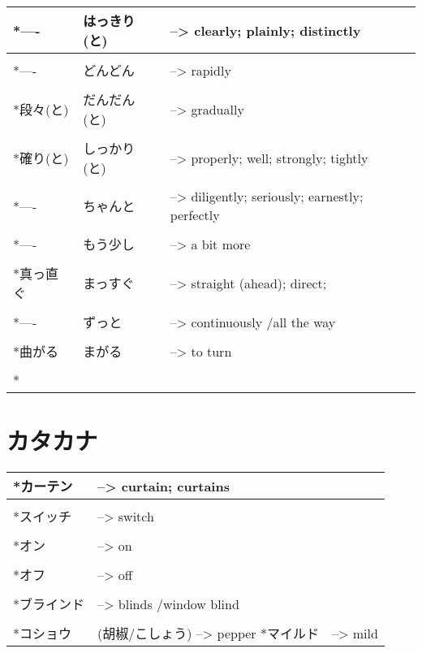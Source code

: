 \documentclass{article}
\begin{document}
\begin{tabular}{ l | l p{13cm} }
*----&はっきり(と)&--> clearly; plainly; distinctly \\ \hline\\[-1em]
*----&どんどん&--> rapidly \\ \hline\\[-1em]
*段々(と)&だんだん(と)&--> gradually \\ \hline\\[-1em]
*確り(と)&しっかり(と)&--> properly; well; strongly; tightly \\ \hline\\[-1em]
*----&ちゃんと&--> diligently; seriously; earnestly; perfectly \\ \hline\\[-1em]
*----&もう少し&--> a bit more \\ \hline\\[-1em]
*真っ直ぐ&まっすぐ&--> straight (ahead); direct; \\ \hline\\[-1em]
*----&ずっと&--> continuously /all the way \\ \hline\\[-1em]
*曲がる&まがる&--> to turn \\ \hline\\[-1em]
*
\end{tabular}





\part*{カタカナ}
\begin{tabular}{ p{3cm} | l l }
*カーテン&--> curtain; curtains \\ \hline\\[-1em]
*スイッチ&--> switch \\ \hline\\[-1em]
*オン&--> on \\ \hline\\[-1em]
*オフ&--> off \\ \hline\\[-1em]
*ブラインド&--> blinds /window blind \\ \hline\\[-1em]
*コショウ&(胡椒/こしょう) --> pepper
*マイルド&--> mild
\end{tabular}

\end{document}
